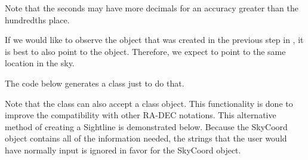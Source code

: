 \documentclass[letterpaper,10pt,english]{sphinxmanual}
\begin{document}
Note that the seconds may have more decimals for an accuracy greater than the hundredths place.

If we would like to observe the object that was created in the previous step in , it is best to also point to the object. Therefore, we expect to point to the same location in the sky.

The code below generates a {\hyperref[\detokenize{model_observing:model_observing.Sightline}]{}} class just to do that.

%
\begin{sphinxVerbatim}[commandchars=\\\{\}]
   
   

   

  
\end{sphinxVerbatim}

Note that the class can also accept a  class object. This functionality is done to improve the compatibility with other RA-DEC notations. This alternative method of creating a Sightline is demonstrated below. Because the SkyCoord object contains all of the information needed, the strings that the user would have normally input is ignored in favor for the SkyCoord object.
\end{document}
